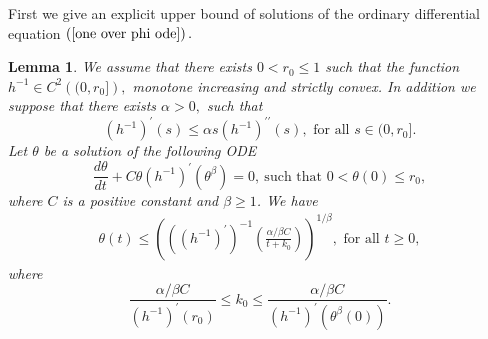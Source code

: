 \documentclass[11pt,reqno]{amsart}
\theoremstyle{plain}
\newtheorem{lemma}{Lemma}
\numberwithin{equation}{section}
\numberwithin{equation}{section}
\begin{document}
First we give an explicit upper bound of solutions of the ordinary
differential equation $\left( \ref{one over phi ode}\right) .$

\begin{lemma}
We assume that there exists $0<r_{0}\leq 1$ such that the function $%
h^{-1}\in C^{2}\left( (0,r_{0}]\right) ,$ monotone increasing and strictly
convex. In addition we suppose that there exists $\alpha >0,$ such that 
\begin{equation}
\left( h^{-1}\right) ^{\prime }\left( s\right) \leq \alpha s\left(
h^{-1}\right) ^{\prime \prime }\left( s\right) ,\text{ for all }s\in
(0,r_{0}].  \label{gamma assumption}
\end{equation}%
Let $\theta $ be a solution of the following ODE%
\begin{equation*}
\dfrac{d\theta }{dt}+C\theta \left( h^{-1}\right) ^{\prime }\left( \theta
^{\beta }\right) =0,~\text{such that }0<\theta \left( 0\right) \leq r_{0},
\end{equation*}%
where $C$ is a positive constant and $\beta \geq 1$. We have%
\begin{equation*}
\begin{array}{c}
\theta \left( t\right) \leq \left( \left( \left( h^{-1}\right) ^{\prime
}\right) ^{-1}\left( \frac{\alpha /\beta C}{t+k_{0}}\right) \right)
^{1/\beta },\text{ for all }t\geq 0,%
\end{array}%
\end{equation*}%
where%
\begin{equation}
\frac{\alpha /\beta C}{\left( h^{-1}\right) ^{\prime }\left( r_{0}\right) }%
\leq k_{0}\leq \frac{\alpha /\beta C}{\left( h^{-1}\right) ^{\prime }\left(
\theta ^{\beta }\left( 0\right) \right) }.  \label{k assumption}
\end{equation}
\end{lemma}
\end{document}
